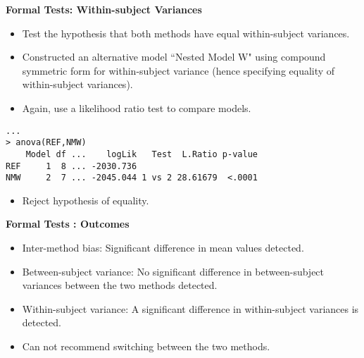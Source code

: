 \documentclass[compress]{beamer}        %
\makeatletter
\newcommand{\tcb}{\textcolor{beamer@blendedblue}}
\makeatother
\begin{document}
\begin{frame}[fragile]{\bf \tcb{Formal Tests: Within-subject Variances}}
\begin{itemize}
\item Test the hypothesis that both methods have equal within-subject variances.
\item Constructed an alternative model ``Nested Model W" using compound symmetric form for within-subject variance (hence specifying equality of within-subject variances).
\item Again, use a likelihood ratio test to compare models.
\end{itemize}
\begin{verbatim}
...
> anova(REF,NMW)
    Model df ...    logLik   Test  L.Ratio p-value
REF     1  8 ... -2030.736
NMW     2  7 ... -2045.044 1 vs 2 28.61679  <.0001
\end{verbatim}
\begin{itemize}
\item Reject hypothesis of equality.
\end{itemize}
\end{frame}
\begin{frame}[fragile]{\bf \tcb{Formal Tests : Outcomes}}
\large
\vspace{-1cm}
\begin{itemize}
\item Inter-method bias: Significant difference in mean values detected.\\
\vspace{0.25cm}\item Between-subject variance: No significant difference in between-subject variances between the two methods detected.\\
\vspace{0.25cm}\item Within-subject variance: A significant difference in within-subject variances is detected.\\
\vspace{0.25cm}\item Can not recommend switching between the two methods.
\end{itemize}
\end{frame}
\end{document}

